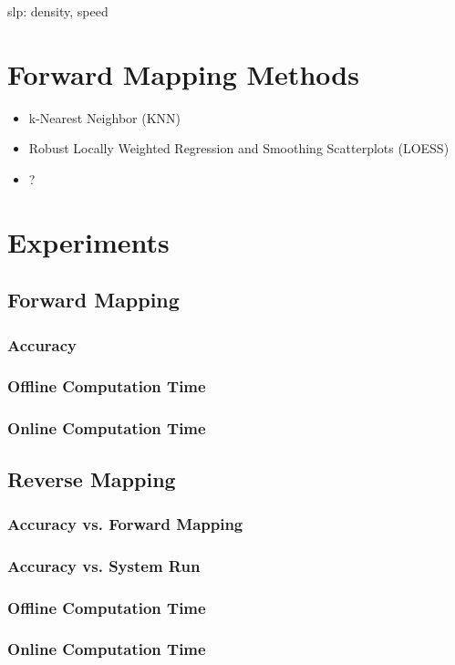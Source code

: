 slp: density, speed


\section{Forward Mapping Methods}\label{sec:fmalgo}

\begin{itemize}
 \item k-Nearest Neighbor (KNN)
 \item Robust Locally Weighted Regression and Smoothing Scatterplots (LOESS)
 \item ?
\end{itemize}



\section{Experiments}\label{sec:exps}

 \subsection{Forward Mapping}

  \subsubsection{Accuracy}

  \subsubsection{Offline Computation Time}

  \subsubsection{Online Computation Time}

 \subsection{Reverse Mapping}

  \subsubsection{Accuracy vs. Forward Mapping}

  \subsubsection{Accuracy vs. System Run}

  \subsubsection{Offline Computation Time}

  \subsubsection{Online Computation Time}
